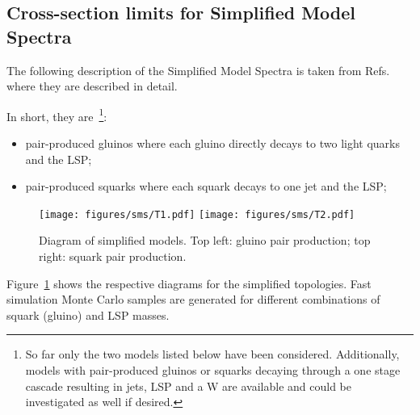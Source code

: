 \subsection{Cross-section limits for Simplified Model Spectra \label{sec:sms}}

The following description of the Simplified Model Spectra is taken
from Refs.~\cite{SMSAN,SMSnote} where they are described in detail.

In short, they are~\footnote{So far only the two models listed below have been considered. 
Additionally, models with pair-produced gluinos or squarks decaying through a one stage cascade
resulting in jets, LSP and a W are available and could be investigated as well if desired.}:

\begin{itemize}
\item pair-produced gluinos where each gluino directly decays to two light quarks and the LSP;
\item pair-produced squarks where each squark decays to one jet and the LSP;
\end{itemize}

\begin{figure}[tbp]
  \begin{center}
      \texttt{[image: figures/sms/T1.pdf]}
      \texttt{[image: figures/sms/T2.pdf]}
      \caption{Diagram of simplified models. Top left: gluino pair
        production; top right: squark pair production.
}
    \label{fig:diagram}
  \end{center}
\end{figure}


Figure~\ref{fig:diagram} shows the respective diagrams for the simplified topologies.
Fast simulation Monte Carlo samples are generated for different combinations of squark 
(gluino) and LSP masses.



